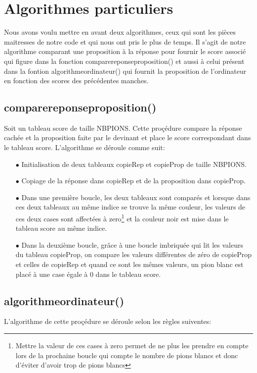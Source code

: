 \documentclass[a4paper, 11pt, oneside]{article}
\begin{document}
\section{Algorithmes particuliers}
Nous avons voulu mettre en avant deux algorithmes, ceux qui sont les pièces maitresses de notre code et qui nous ont pris le plus de temps. Il s'agit de notre algorithme comparant une proposition à la réponse pour fournir le score associé qui figure dans la fonction compare\textunderscore reponse\textunderscore proposition() et aussi à celui présent dans la fontion algorithme\textunderscore ordinateur() qui fournit la proposition de l'ordinateur en fonction des scores des précédentes manches.
\subsection{compare\textunderscore reponse\textunderscore proposition()}
Soit un tableau score de taille NB\textunderscore PIONS.
Cette proçédure compare la réponse cachée et la proposition faite par le devinant et place le score correspondant dans le tableau score. L'algorithme se déroule comme suit:
\begin{itemize}
    \item[$\bullet$] Initialisation de deux tableaux copieRep et copieProp de taille NB\textunderscore PIONS.
    \item[$\bullet$] Copiage de la réponse dans copieRep et de la proposition dans copieProp.
    \item[$\bullet$] Dans une première boucle, les deux tableaux sont comparés et lorsque dans ces deux tableaux au même indice se trouve la même couleur, les valeurs de ces deux cases sont affectées à zero\footnote{Mettre la valeur de ces cases à zero permet de ne plus les prendre en compte lors de la prochaine boucle qui compte le nombre de pions blancs et donc d'éviter d'avoir trop de pions blancs} et la couleur noir est mise dans le tableau score au même indice.
    \item[$\bullet$] Dans la deuxième boucle, grâce à une boucle imbriquée qui lit les valeurs du tableau copieProp, on compare les valeurs différentes de zéro de copieProp et celles de copieRep et quand ce sont les mêmes valeurs, un pion blanc est placé à une case égale à 0 dans le tableau score.
\end{itemize}

\subsection{algorithme\textunderscore ordinateur()}
L'algorithme de cette proçédure se déroule selon les règles suiventes:
\end{document}
